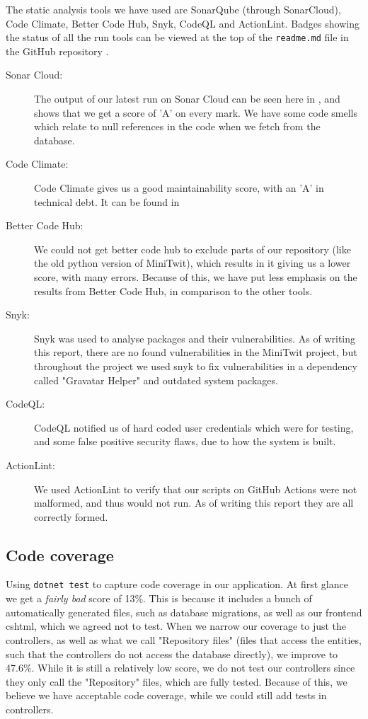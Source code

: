 The static analysis tools we have used are SonarQube (through SonarCloud), Code Climate, Better Code Hub, Snyk, CodeQL and ActionLint. Badges showing the status of all the run tools can be viewed at the top of the \texttt{readme.md} file in the GitHub repository \cite{repository}.
\begin{description}
\item [Sonar Cloud:] The output of our latest run on Sonar Cloud can be seen here in \cite{sonarcloud}, and shows that we get a score of 'A' on every mark. We have some code smells which relate to null references in the code when we fetch from the database.
\item [Code Climate:] Code Climate gives us a good maintainability score, with an 'A' in technical debt. It can be found in \cite{codeclimate}
\item [Better Code Hub:] We could not get better code hub to exclude parts of our repository (like the old python version of MiniTwit), which results in it giving us a lower score, with many errors. Because of this, we have put less emphasis on the results from Better Code Hub, in comparison to the other tools.
\item [Snyk:] Snyk was used to analyse packages and their vulnerabilities. As of writing this report, there are no found vulnerabilities in the MiniTwit project, but throughout the project we used snyk to fix vulnerabilities in a dependency called "Gravatar Helper" and outdated system packages.
\item [CodeQL:] CodeQL notified us of hard coded user credentials which were for testing, and some false positive security flaws, due to how the system is built. 
\item [ActionLint:] We used ActionLint to verify that our scripts on GitHub Actions were not malformed, and thus would not run. As of writing this report they are all correctly formed.
\end{description}

\subsection{Code coverage}
Using \texttt{dotnet test} to capture code coverage in our application. At first glance we get a \textit{fairly bad} score of 13\%. This is because it includes a bunch of automatically generated files, such as database migrations, as well as our frontend cshtml, which we agreed not to test. When we narrow our coverage to just the controllers, as well as what we call "Repository files" (files that access the entities, such that the controllers do not access the database directly), we improve to 47.6\%. While it is still a relatively low score, we do not test our controllers since they only call the "Repository" files, which are fully tested. Because of this, we believe we have acceptable code coverage, while we could still add tests in controllers.


